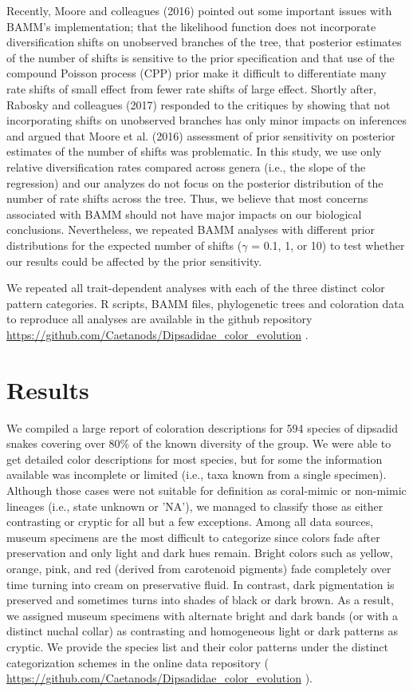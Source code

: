 Recently, Moore and colleagues (2016) pointed out some important issues with BAMM's implementation; that the likelihood function does not incorporate diversification shifts on unobserved branches of the tree, that posterior estimates of the number of shifts is sensitive to the prior specification and that use of the compound Poisson process (CPP) prior make it difficult to differentiate many rate shifts of small effect from fewer rate shifts of large effect. Shortly after, Rabosky and colleagues (2017) responded to the critiques by showing that not incorporating shifts on unobserved branches has only minor impacts on inferences and argued that Moore et al. (2016) assessment of prior sensitivity on posterior estimates of the number of shifts was problematic. In this study, we use only relative diversification rates compared across genera (i.e., the slope of the regression) and our analyzes do not focus on the posterior distribution of the number of rate shifts across the tree. Thus, we believe that most concerns associated with BAMM should not have major impacts on our biological conclusions. Nevertheless, we repeated BAMM analyses with different prior distributions for the expected number of shifts ($\gamma$ = 0.1, 1, or 10) to test whether our results could be affected by the prior sensitivity.

We repeated all trait-dependent analyses with each of the three distinct color pattern categories. R scripts, BAMM files, phylogenetic trees and coloration data to reproduce all analyses are available in the github repository \url{https://github.com/Caetanods/Dipsadidae_color_evolution} .

\section{Results}

We compiled a large report of coloration descriptions for 594 species of dipsadid snakes covering over 80\% of the known diversity of the group. We were able to get detailed color descriptions for most species, but for some the information available was incomplete or limited (i.e., taxa known from a single specimen). Although those cases were not suitable for definition as coral-mimic or non-mimic lineages (i.e., state unknown or 'NA'), we managed to classify those as either contrasting or cryptic for all but a few exceptions. Among all data sources, museum specimens are the most difficult to categorize since colors fade after preservation and only light and dark hues remain. Bright colors such as yellow, orange, pink, and red (derived from carotenoid pigments) fade completely over time turning into cream on preservative fluid. In contrast, dark pigmentation is preserved and sometimes turns into shades of black or dark brown. As a result, we assigned museum specimens with alternate bright and dark bands (or with a distinct nuchal collar) as contrasting and homogeneous light or dark patterns as cryptic. We provide the species list and their color patterns under the distinct categorization schemes in the online data repository ( \url{https://github.com/Caetanods/Dipsadidae_color_evolution} ).

